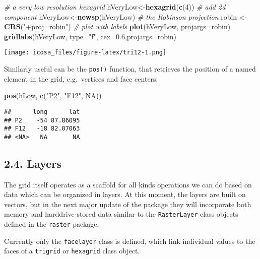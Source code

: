 \documentclass[]{article}
\newenvironment{Shaded}{\begin{snugshade}}{\end{snugshade}}
\newcommand{\KeywordTok}[1]{\textcolor[rgb]{0.13,0.29,0.53}{\textbf{#1}}}
\newcommand{\DataTypeTok}[1]{\textcolor[rgb]{0.13,0.29,0.53}{#1}}
\newcommand{\DecValTok}[1]{\textcolor[rgb]{0.00,0.00,0.81}{#1}}
\newcommand{\FloatTok}[1]{\textcolor[rgb]{0.00,0.00,0.81}{#1}}
\newcommand{\StringTok}[1]{\textcolor[rgb]{0.31,0.60,0.02}{#1}}
\newcommand{\CommentTok}[1]{\textcolor[rgb]{0.56,0.35,0.01}{\textit{#1}}}
\newcommand{\OtherTok}[1]{\textcolor[rgb]{0.56,0.35,0.01}{#1}}
\newcommand{\NormalTok}[1]{#1}
\begin{document}
\begin{Shaded}
\begin{Highlighting}[]
\CommentTok{# a very low resolution hexagrid}
\NormalTok{hVeryLow<-}\KeywordTok{hexagrid}\NormalTok{(}\KeywordTok{c}\NormalTok{(}\DecValTok{4}\NormalTok{))}
\CommentTok{# add 2d component}
\NormalTok{hVeryLow<-}\KeywordTok{newsp}\NormalTok{(hVeryLow)}
\CommentTok{# the Robinson projection}
\NormalTok{robin <-}\StringTok{ }\KeywordTok{CRS}\NormalTok{(}\StringTok{"+proj=robin"}\NormalTok{)}
\CommentTok{# plot with labels}
\KeywordTok{plot}\NormalTok{(hVeryLow, }\DataTypeTok{projargs=}\NormalTok{robin)}
\KeywordTok{gridlabs}\NormalTok{(hVeryLow, }\DataTypeTok{type=}\StringTok{"f"}\NormalTok{, }\DataTypeTok{cex=}\FloatTok{0.6}\NormalTok{,}\DataTypeTok{projargs=}\NormalTok{robin)}
\end{Highlighting}
\end{Shaded}

\texttt{[image: icosa\_files/figure-latex/tri12-1.png]}

Similarly useful can be the \texttt{pos()} function, that retrieves the
position of a named element in the grid, e.g.~vertices and face centers:

\begin{Shaded}
\begin{Highlighting}[]
\KeywordTok{pos}\NormalTok{(hLow, }\KeywordTok{c}\NormalTok{(}\StringTok{"P2"}\NormalTok{, }\StringTok{"F12"}\NormalTok{, }\OtherTok{NA}\NormalTok{))}
\end{Highlighting}
\end{Shaded}

\begin{verbatim}
##      long      lat
## P2    -54 87.86095
## F12   -18 82.07063
## <NA>   NA       NA
\end{verbatim}

\subsection{2.4. Layers}\label{layers}

The grid itself operates as a scaffold for all kinds operations we can
do based on data which can be organized in layers. At this moment, the
layers are built on vectors, but in the next major update of the package
they will incorporate both memory and harddrive-stored data similar to
the \texttt{RasterLayer} class objects defined in the \texttt{raster}
package.

Currently only the \texttt{facelayer} class is defined, which link
individual values to the faces of a \texttt{trigrid} or
\texttt{hexagrid} class object.
\end{document}

